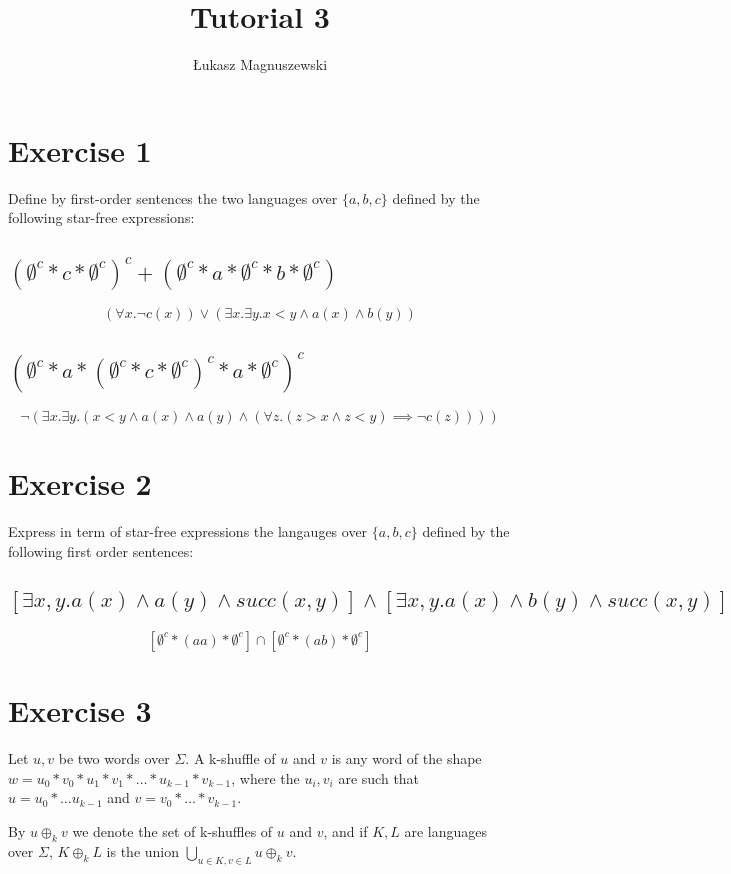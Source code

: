 \documentclass{article}
\author{Łukasz Magnuszewski}
\title{Tutorial 3}
\begin{document}
\maketitle

\section{Exercise 1}
Define by first-order sentences the two languages over $\{a,b,c\}$ defined by the following star-free expressions:
\subsection{$(\emptyset^c * c * \emptyset^c)^c + 
(\emptyset^c * a * \emptyset^c * b * \emptyset^c)$}
\[
  (\forall x. \neg c(x)) \lor (\exists x. \exists y. x < y \land a(x) \land b(y))
\]
\subsection{$(\emptyset^c * a * (\emptyset^c * c * \emptyset^c)^c * a * \emptyset^c)^c$}
\[
  \neg (\exists x. \exists y. (x < y \land a(x) \land a(y) \land (\forall z. (z > x \land z < y) \implies \neg c(z))))
\]

\section{Exercise 2}
Express in term of star-free expressions the langauges over $\{a, b, c\}$ defined by the following first order sentences:
\subsection{$[\exists x,y. a(x) \land a(y) \land succ(x,y)] \land [\exists x,y. a(x) \land b(y)\land succ(x,y)]$}
\[
  [\emptyset^c * (aa) * \emptyset^c] \cap [ \emptyset^c * (ab) * \emptyset^c] 
\]

\section{Exercise 3}
Let $u, v$ be two words over $\Sigma$. A k-shuffle of $u$ and $v$ is any word of the shape 
$w = u_0 * v_0 * u_1 * v_1 * \ldots * u_{k-1} * v_{k-1}$, where the $u_i, v_i$ are such that
$u = u_0 * \ldots u_{k-1}$ and $v = v_0 * \ldots * v_{k-1}$.

By $u \oplus_k v$ we denote the set of k-shuffles of $u$ and $v$, and if $K, L$ are languages over $\Sigma$, $K \oplus_k L$ is the union $\bigcup_{u\in K, v \in L} u \oplus_k v$.
\end{document}
